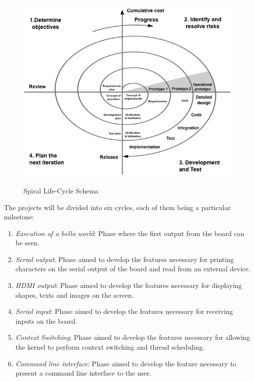 \begin{figure}
\begin{center}
\includegraphics[width=1\textwidth]{includes/figures/chapter4_spiral_life_cycle_schema.png}  \\[0.5 cm]
\end{center}
\caption{Spiral Life-Cycle Schema}
\label{fig:chapter4_spiral_life_cycle_schema}
\end{figure}



The projects will be divided into six cycles, each of them being a particular milestone:
\begin{enumerate}
	\item \textit{Execution of a hello world}: Phase where the first output from the board can be seen.
	\item \textit{Serial output}: Phase aimed to develop the features necessary for printing characters on the serial output of the board and read from an external device.
	\item \textit{HDMI output}: Phase aimed to develop the features necessary for displaying shapes, texts and images on the screen.
	\item \textit{Serial input}: Phase aimed to develop the features necessary for receiving inputs on the board.
	\item \textit{Context Switching}: Phase aimed to develop the features necessary for allowing the kernel to perform context switching and thread scheduling.
	\item \textit{Command line interface}: Phase aimed to develop the feature necessary to present a command line interface to the user.
\end{enumerate}


